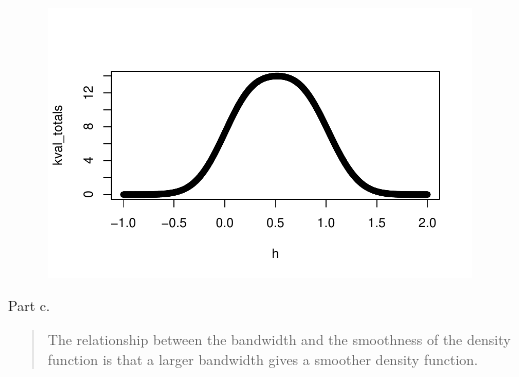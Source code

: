 \documentclass[
  letterpaper,
  DIV=11,
  numbers=noendperiod]{scrartcl}
\begin{document}
\begin{figure}[H]

{\centering \includegraphics{robby_homework_2_files/figure-pdf/unnamed-chunk-11-1.pdf}

}

\end{figure}

Part c.

\begin{quote}
The relationship between the bandwidth and the smoothness of the density
function is that a larger bandwidth gives a smoother density function.
\end{quote}
\end{document}

